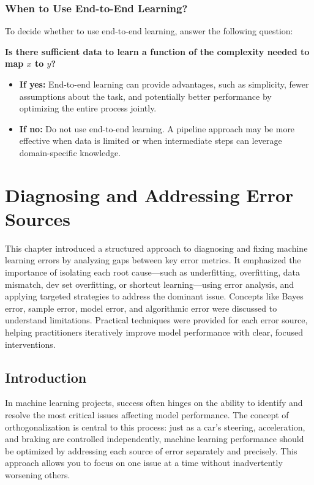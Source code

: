 \documentclass[12pt,openany]{book}
\begin{document}
\subsection{When to Use End-to-End Learning?}
To decide whether to use end-to-end learning, answer the following question: \newline

\textbf{Is there sufficient data to learn a function of the complexity needed to map \(x\) to \(y\)?} 
\begin{itemize}
    \item \textbf{If yes:} End-to-end learning can provide advantages, such as simplicity, fewer assumptions about the task, and potentially better performance by optimizing the entire process jointly.
    \item \textbf{If no:} Do not use end-to-end learning. A pipeline approach may be more effective when data is limited or when intermediate steps can leverage domain-specific knowledge.
\end{itemize}




\chapter{Diagnosing and Addressing Error Sources}

\begin{examplebox} This chapter introduced a structured approach to diagnosing and fixing machine learning errors by analyzing gaps between key error metrics. It emphasized the importance of isolating each root cause—such as underfitting, overfitting, data mismatch, dev set overfitting, or shortcut learning—using error analysis, and applying targeted strategies to address the dominant issue. Concepts like Bayes error, sample error, model error, and algorithmic error were discussed to understand limitations. Practical techniques were provided for each error source, helping practitioners iteratively improve model performance with clear, focused interventions. \end{examplebox}



\section*{Introduction}

In machine learning projects, success often hinges on the ability to identify and resolve the most critical issues affecting model performance. The concept of orthogonalization is central to this process: just as a car’s steering, acceleration, and braking are controlled independently, machine learning performance should be optimized by addressing each source of error separately and precisely. This approach allows you to focus on one issue at a time without inadvertently worsening others. \newline
\end{document}
